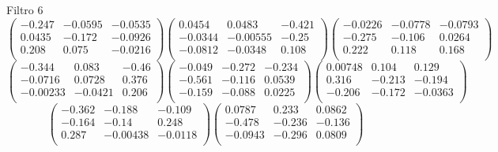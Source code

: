 Filtro 6
{ \small
\[
\begin{pmatrix}
  -0.247 & -0.0595 & -0.0535 \\
  0.0435 & -0.172 & -0.0926 \\
  0.208 & 0.075 & -0.0216 \\
\end{pmatrix}
\begin{pmatrix}
  0.0454 & 0.0483 & -0.421 \\
  -0.0344 & -0.00555 & -0.25 \\
  -0.0812 & -0.0348 & 0.108 \\
\end{pmatrix}
\begin{pmatrix}
  -0.0226 & -0.0778 & -0.0793 \\
  -0.275 & -0.106 & 0.0264 \\
  0.222 & 0.118 & 0.168 \\
\end{pmatrix}
\]
\[
\begin{pmatrix}
  -0.344 & 0.083 & -0.46 \\
  -0.0716 & 0.0728 & 0.376 \\
  -0.00233 & -0.0421 & 0.206 \\
\end{pmatrix}
\begin{pmatrix}
  -0.049 & -0.272 & -0.234 \\
  -0.561 & -0.116 & 0.0539 \\
  -0.159 & -0.088 & 0.0225 \\
\end{pmatrix}
\begin{pmatrix}
  0.00748 & 0.104 & 0.129 \\
  0.316 & -0.213 & -0.194 \\
  -0.206 & -0.172 & -0.0363 \\
\end{pmatrix}
\]
\[
\begin{pmatrix}
  -0.362 & -0.188 & -0.109 \\
  -0.164 & -0.14 & 0.248 \\
  0.287 & -0.00438 & -0.0118 \\
\end{pmatrix}
\begin{pmatrix}
  0.0787 & 0.233 & 0.0862 \\
  -0.478 & -0.236 & -0.136 \\
  -0.0943 & -0.296 & 0.0809 \\
\end{pmatrix}
\]
}

